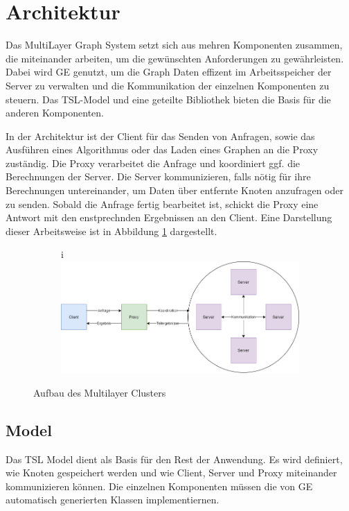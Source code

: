 
\section{Architektur}

Das MultiLayer Graph System setzt sich aus mehren Komponenten zusammen, die miteinander arbeiten, um die gewünschten Anforderungen zu gewährleisten.
Dabei wird GE genutzt, um die Graph Daten effizent im Arbeitsspeicher der Server zu verwalten und die Kommunikation der einzelnen Komponenten zu steuern.  Das TSL-Model und eine geteilte Bibliothek bieten die Basis für die
anderen Komponenten.

In der Architektur ist der Client für das Senden von Anfragen, sowie das Ausführen eines Algorithmus oder das Laden eines Graphen an die Proxy zuständig.
Die Proxy verarbeitet die Anfrage und koordiniert ggf. die Berechnungen der Server. Die Server kommunizieren, falls nötig für ihre Berechnungen untereinander, um Daten über entfernte Knoten anzufragen oder zu senden. Sobald die Anfrage fertig bearbeitet ist, schickt die Proxy eine Antwort mit den enstprechnden Ergebnissen an den Client.
Eine Darstellung dieser Arbeitsweise ist in Abbildung \ref{architektur} dargestellt.

\begin{figure}
  \centering
  \begin{subfigure}[b]{1.0\textwidth}i
    \includegraphics[width=1.0\linewidth]{img/Architektur-Cluster.png}
  \end{subfigure}
  \caption{Aufbau des Multilayer Clusters}
  \label{architektur}
\end{figure}



\subsection{Model}

Das TSL Model dient als Basis für den Rest der Anwendung. Es wird definiert, wie Knoten gespeichert werden und wie Client, Server und Proxy miteinander
kommunizieren können. Die einzelnen Komponenten müssen die von GE automatisch generierten Klassen implementiernen.


